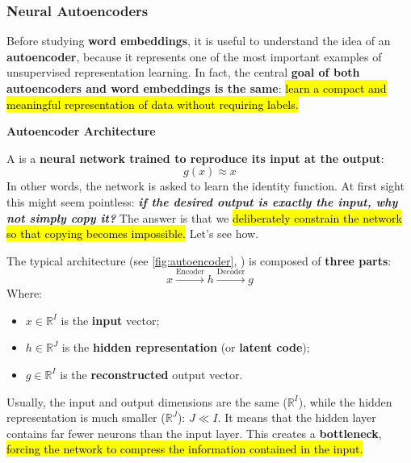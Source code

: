 \subsubsection{Neural Autoencoders}\label{sec:neural-autoencoders}

Before studying \textbf{word embeddings}, it is useful to understand the idea of an \textbf{autoencoder}, because it represents one of the most important examples of unsupervised representation learning. In fact, the central \textbf{goal of both autoencoders and word embeddings is the same}: \hl{learn a compact and meaningful representation of data without requiring labels.}

\highspace
\begin{flushleft}
    \textcolor{Green3}{ \textbf{Autoencoder Architecture}}
\end{flushleft}
A  is a \textbf{neural network trained to reproduce its input at the output}:
\begin{equation*}
    g(x) \approx x
\end{equation*}
In other words, the network is asked to learn the identity function. At first sight this might seem pointless: \emph{\textbf{if the desired output is exactly the input, why not simply copy it?}} The answer is that we \hl{deliberately constrain the network so that copying becomes impossible.} Let's see how.

\highspace
The typical architecture (see \autoref{fig:autoencoder}, ) is composed of \textbf{three parts}:
\begin{equation*}
    x \xrightarrow{\text{Encoder}} h \xrightarrow{\text{Decoder}} g
\end{equation*}
Where:
\begin{itemize}
    \item $x \in \mathbb{R}^{I}$ is the \textbf{input} vector;
    \item $h \in \mathbb{R}^{J}$ is the \textbf{hidden representation} (or \textbf{latent code});
    \item $g \in \mathbb{R}^{I}$ is the \textbf{reconstructed} output vector.
\end{itemize}
Usually, the input and output dimensions are the same ($\mathbb{R}^{I}$), while the hidden representation is much smaller ($\mathbb{R}^{J}$): $J \ll I$. It means that the hidden layer contains far fewer neurons than the input layer. This creates a \textbf{bottleneck}, \hl{forcing the network to compress the information contained in the input.}

